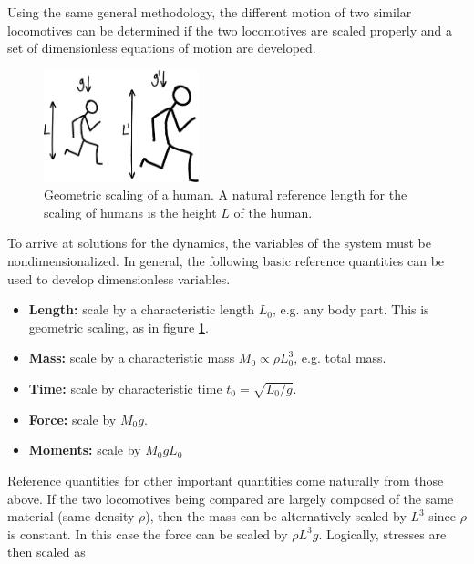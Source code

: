 Using the same general methodology, the different motion of two similar locomotives can be determined if the two locomotives are scaled properly and a set of dimensionless equations of motion are developed.  

\begin{figure}[h]		%
\begin{centering}
\includegraphics[width=0.4\textwidth]{Figures/ScaledPerson}\par
\end{centering}
\caption[Diagram: Geometric Scaling of a Human]{Geometric scaling of a human. A natural reference length for the scaling of humans is the height $L$ of the human.}
\label{fig:ScaledPerson}
\end{figure}
%

To arrive at solutions for the dynamics, the variables of the system must be nondimensionalized. In general, the following basic reference quantities can be used to develop dimensionless variables.

\begin{itemize}
\item \textbf{Length:} scale by a characteristic length $L_{0}$, e.g. any body part. This is geometric scaling, as in figure \ref{fig:ScaledPerson}.
\item \textbf{Mass:} scale by a characteristic mass $M_{0} \propto \rho L_{0}^{3}$, e.g. total mass.
\item \textbf{Time:} scale by characteristic time $t_{0} = \sqrt{L_{0}/g}$.
\item \textbf{Force:} scale by $M_{0}g$.
\item \textbf{Moments:} scale by $M_{0} g L_{0}$
\end{itemize}

Reference quantities for other important quantities come naturally from those above. If the two locomotives being compared are largely composed of the same material (same density $\rho$), then the mass can be alternatively scaled by $L^{3}$ since $\rho$ is constant. In this case the force can be scaled by $\rho L^{3} g$. Logically, stresses are then scaled as 

